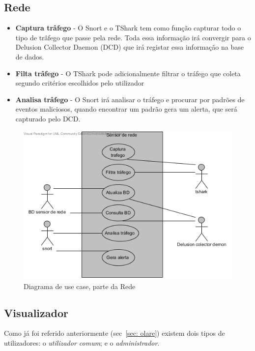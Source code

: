 \subsection{\textbf{Rede}}
\begin{itemize}
 \item \textbf{Captura trâfego} - O Snort e o TShark tem como função capturar todo o tipo de trâfego que passe pela rede. Toda essa informação
 irá convergir para o Delusion Collector Daemon (DCD) que irá registar essa informação na base de dados.
 \item \textbf{Filta trâfego} - O TShark pode adicionalmente filtrar o tráfego que coleta segundo critérios escolhidos pelo utilizador
 \item \textbf{Analisa trâfego} - O Snort irá analisar o tráfego e procurar por padrões de eventos maliciosos, quando encontrar um padrão gera um
 alerta, que será capturado pelo DCD.
 \end{itemize}

\begin{figure}[!ht]
	\centering
	\includegraphics[scale=0.80]{images/ucs/Rede}
	\caption {Diagrama de use case, parte da Rede}
\end{figure}
\pagebreak

\newcommand{\uticomum}{\emph{utilizador comum}\xspace} 
\newcommand{\admini}{\emph{administrador}\xspace} 
\newcommand{\visualz}{\emph{visualizador}\xspace}
\subsection{\textbf{Visualizador}}

Como já foi referido anteriormente (sec~\ref{sec: olare}) existem dois tipos de utilizadores: o \uticomum; e o \admini.\\ 

